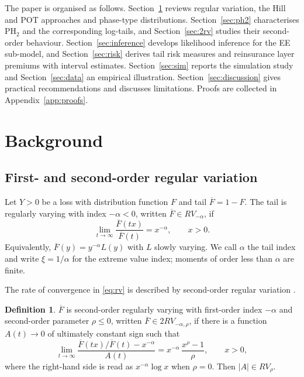 \documentclass[12pt]{article}
\theoremstyle{definition}
\newtheorem{definition}[theorem]{Definition}
\theoremstyle{remark}
\newcommand{\bF}{\overline{F}}
\begin{document}
The paper is organised as follows. Section~\ref{sec:background} reviews regular variation, the Hill and POT approaches and phase-type distributions. Section~\ref{sec:ph2} characterises PH$_2$ and the corresponding log-tails, and Section~\ref{sec:2rv} studies their second-order behaviour. Section~\ref{sec:inference} develops likelihood inference for the EE sub-model, and Section~\ref{sec:risk} derives tail risk measures and reinsurance layer premiums with interval estimates. Section~\ref{sec:sim} reports the simulation study and Section~\ref{sec:data} an empirical illustration. Section~\ref{sec:discussion} gives practical recommendations and discusses limitations. Proofs are collected in Appendix~\ref{app:proofs}.

\section{Background}\label{sec:background}

\subsection{First- and second-order regular variation}

Let $Y>0$ be a loss with distribution function $F$ and tail $\bF=1-F$. The tail is regularly varying with index $-\alpha<0$, written $\bF\in RV_{-\alpha}$, if
\begin{equation}\label{eq:rv}
\lim_{t\to\infty}\frac{\bF(tx)}{\bF(t)}=x^{-\alpha},\qquad x>0.
\end{equation}
Equivalently, $\bF(y)=y^{-\alpha}L(y)$ with $L$ slowly varying. We call $\alpha$ the tail index and write $\xi=1/\alpha$ for the extreme value index; moments of order less than $\alpha$ are finite.

The rate of convergence in \eqref{eq:rv} is described by second-order regular variation \citep{Geluk1997,DeHaanFerreira2006}.

\begin{definition}\label{def:2rv}
$\bF$ is second-order regularly varying with first-order index $-\alpha$ and second-order parameter $\rho\le 0$, written $\bF\in 2RV_{-\alpha,\rho}$, if there is a function $A(t)\to0$ of ultimately constant sign such that
\begin{equation}\label{eq:2rv}
\lim_{t\to\infty}\frac{\bF(tx)/\bF(t)-x^{-\alpha}}{A(t)}=x^{-\alpha}\,\frac{x^{\rho}-1}{\rho},\qquad x>0,
\end{equation}
where the right-hand side is read as $x^{-\alpha}\log x$ when $\rho=0$. Then $|A|\in RV_{\rho}$.
\end{definition}
\end{document}
